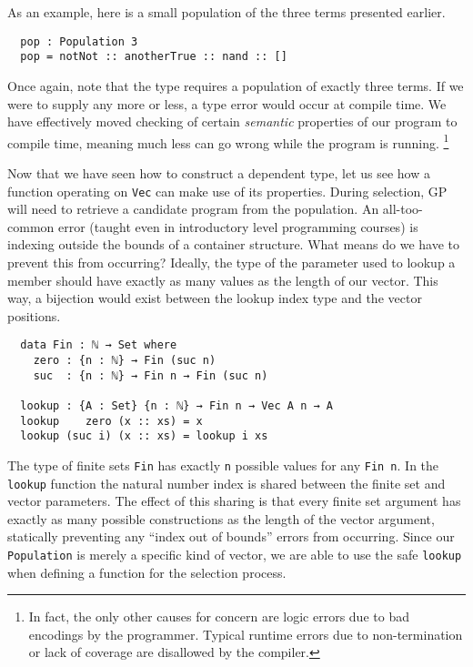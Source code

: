 \documentclass[runningheads,a4paper]{llncs}
\begin{document}
As an example, here is a small population of the three terms presented
earlier.

\begin{verbatim}
  pop : Population 3
  pop = notNot :: anotherTrue :: nand :: []
\end{verbatim}

Once again, note that the type requires a population of exactly three
terms. If we were to supply any more or less, a type error would occur at
compile time. We have effectively moved checking of certain \textit{semantic}
properties of our program to compile time, meaning much less can go
wrong while the program is running.
\footnote{In fact, the only other causes for concern are logic errors
  due to bad encodings by the programmer. Typical runtime errors due to
  non-termination or lack of coverage are disallowed by the compiler.}

Now that we have seen how to construct a dependent type, let us see how
a function operating on \texttt{Vec} can make use of its properties.
During selection, GP will need to retrieve a candidate program from
the population. An all-too-common error (taught even in introductory
level programming courses) is indexing outside the bounds of a container
structure. What means do we have to prevent this from occurring? Ideally,
the type of the parameter used to lookup a member should have exactly as many values
as the length of our vector. This way, a bijection would exist between
the lookup index type and the vector positions.

\begin{verbatim}
  data Fin : ℕ → Set where
    zero : {n : ℕ} → Fin (suc n)
    suc  : {n : ℕ} → Fin n → Fin (suc n)

  lookup : {A : Set} {n : ℕ} → Fin n → Vec A n → A
  lookup    zero (x :: xs) = x
  lookup (suc i) (x :: xs) = lookup i xs
\end{verbatim}

The type of finite sets \texttt{Fin} has exactly \texttt{n} possible
values for any \texttt{Fin n}. In the \texttt{lookup} function the
natural number index is shared between the finite set and vector
parameters. The effect of this sharing is that every finite set
argument has exactly as many possible constructions as the length of
the vector argument, statically preventing any ``index out of bounds''
errors from occurring. Since our \texttt{Population} is merely a
specific kind of vector, we are able to use the safe \texttt{lookup}
when defining a function for the selection process.
\end{document}
